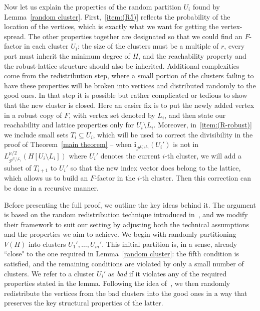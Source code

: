 \documentclass[11pt, letterpaper]{amsart}
\theoremstyle{plain}
\numberwithin{equation}{section}
\theoremstyle{definition}
\renewcommand{\vec}[1]{{\mathbf #1}}
\begin{document}
Now let us explain the properties of the random partition $U_i$ found by Lemma~\ref{random cluster}.
First,~\ref{item:(R5)} reflects the probability of the location of the vertices, which is exactly what we want for getting the vertex-spread.
The other properties together are designated so that we could find an $F$-factor in each cluster $U_i$: the size of the clusters must be a multiple of $r$, every part must inherit the minimum degree of $H$, and the reachability property and the robust-lattice structure should also be inherited.
Additional complexities come from the redistribution step, where a small portion of the clusters failing to have these properties will be broken into vertices and distributed randomly to the good ones.
In that step it is possible but rather complicated or tedious to show that the new cluster is closed.
Here an easier fix is to put the newly added vertex in a robust copy of $F$, with vertex set denoted by $L_i$, and then state our reachability and lattice properties only for $U_i\setminus L_i$.
Moreover, in~\ref{item:(R-robust)} we include small sets $T_i\subseteq U_i$, which will be used to correct the divisibility in the proof of Theorem~\ref{main theorem} -- when $\vec{i}_{\mathcal P^{U_i\setminus L_i}}(U_i')$ is not in $L_{\mathcal P^{U_i\setminus L_i}}^{\mu/2}(H[U_i\setminus L_i])$ where $U_i
'$ denotes the current $i$-th cluster, we will add a subset of $T_{i+1}$ to $U_i'$ so that the new index vector does belong to the lattice, which allows us to build an $F$-factor in the $i$-th cluster.
Then this correction can be done in a recursive manner.

Before presenting the full proof, we outline the key ideas behind it. The argument is based on the random redistribution technique introduced in~\cite{kelly2024optimal}, and we modify their framework to suit our setting by adjusting both the technical assumptions and the properties we aim to achieve. 
We begin with randomly partitioning \(V(H)\) into clusters \(U_1',\dots,U_m'\). 
This initial partition is, in a sense, already ``close" to the one required in Lemma~\ref{random cluster}: the fifth condition is satisfied, and the remaining conditions are violated by only a small number of clusters. 
We refer to a cluster \(U_i'\) as \emph{bad} if it violates any of the required properties stated in the lemma. 
Following the idea of~\cite{kelly2024optimal}, we then randomly redistribute the vertices from the bad clusters into the good ones in a way that preserves the key structural properties of the latter. 
    
\end{document}
